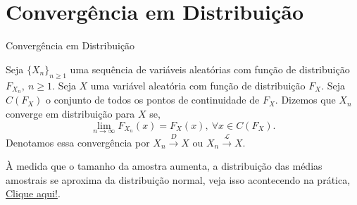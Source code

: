 \documentclass[12pt]{beamer}
\begin{document}
\section{Convergência em Distribuição}
\begin{frame}{Convergência em Distribuição}
\begin{definicao}
\justifying
Seja $\{X_{n}\}_{n\geq 1}$ uma sequência de variáveis aleatórias com função de distribuição $F_{X_{n}},~n\geq 1.$ Seja $X$ uma variável aleatória com função de distribuição $F_{X}.$ Seja $C(F_{X})$ o conjunto de todos os pontos de continuidade de $F_{X}$. Dizemos que $X_{n}$ converge em distribuição para $X$ se,
$$\lim_{{n \to \infty}} F_{X_{n}}(x) = F_X(x), ~\forall x \in C(F_X).$$ Denotamos essa convergência por $X_{n} \overset{D}{\rightarrow} X$ ou $X_{n} \overset{\mathcal{L}}{\rightarrow} X.$
\end{definicao}
\pause
\begin{block}{}
	À medida que o tamanho da amostra aumenta, a distribuição das médias amostrais se aproxima da distribuição normal, veja isso acontecendo na prática, \href{https://est711.shinyapps.io/ConvergenciaProbabilidade/}{Clique aqui!}.
\end{block}

\end{frame}
\end{document}
